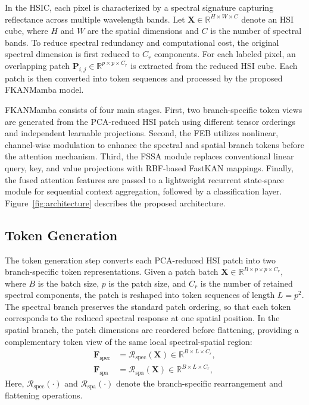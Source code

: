 \documentclass{ieeeaccess}
\begin{document}
In the HSIC, each pixel is characterized by a spectral signature capturing reflectance across multiple wavelength bands. Let $\mathbf{X}\in\mathbb{R}^{H\times W\times C}$ denote an HSI cube, where $ H$ and $ W$ are the spatial dimensions and $C$ is the number of spectral bands. To reduce spectral redundancy and computational cost, the original spectral dimension is first reduced to $C_r$ components. For each labeled pixel, an overlapping patch $\mathbf{P}_{i,j}\in\mathbb{R}^{p\times p\times C_r}$ is extracted from the reduced HSI cube. Each patch is then converted into token sequences and processed by the proposed FKANMamba model.

FKANMamba consists of four main stages. First, two branch-specific token views are generated from the PCA-reduced HSI patch using different tensor orderings and independent learnable projections. Second, the FEB utilizes nonlinear, channel-wise modulation to enhance the spectral and spatial branch tokens before the attention mechanism. Third, the FSSA module replaces conventional linear query, key, and value projections with RBF-based FastKAN mappings. Finally, the fused attention features are passed to a lightweight recurrent state-space module for sequential context aggregation, followed by a classification layer. Figure~\ref {fig:architecture} describes the proposed architecture.

\subsection{Token Generation}

The token generation step converts each PCA-reduced HSI patch into two branch-specific token representations. Given a patch batch
$\mathbf{X}\in\mathbb{R}^{B\times p\times p\times C_r}$, where $B$ is the batch size, $p$ is the patch size, and $C_r$ is the number of retained spectral components, the patch is reshaped into token sequences of length $L=p^2$. The spectral branch preserves the standard patch ordering, so that each token corresponds to the reduced spectral response at one spatial position. In the spatial branch, the patch dimensions are reordered before flattening, providing a complementary token view of the same local spectral-spatial region:
\begin{equation}
\begin{aligned}
\mathbf{F}_{\mathrm{spec}} &=
\mathcal{R}_{\mathrm{spec}}(\mathbf{X})
\in \mathbb{R}^{B\times L\times C_r}, \\
\mathbf{F}_{\mathrm{spa}} &=
\mathcal{R}_{\mathrm{spa}}(\mathbf{X})
\in \mathbb{R}^{B\times L\times C_r},
\end{aligned}
\label{eq:patch_tokens}
\end{equation}
Here, $\mathcal{R}_{\mathrm{spec}}(\cdot)$ and $\mathcal{R}_{\mathrm{spa}}(\cdot)$ denote the branch-specific rearrangement and flattening operations.
\end{document}
